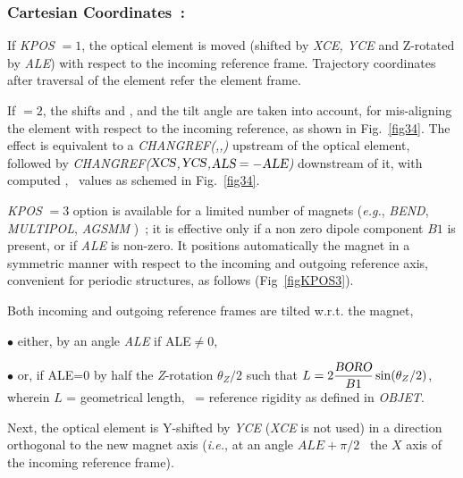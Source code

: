 { \subsubsection*{Cartesian Coordinates~: }    
 
 If \textsl{KPOS} $ =1$, the optical element is moved (shifted by \textsl{XCE, YCE} and Z-rotated by 
\textsl{ALE}) with respect to the incoming reference frame. Trajectory coordinates after traversal of the 
element refer the element frame. 

\medskip

\noindent If  \KPOS$=2 $, the shifts  \XCE{}   
and   \YCE{}, and the tilt angle \ALE{}   are taken into 
account, for mis-aligning  the element with respect to the incoming 
reference, as shown in Fig.~\ref{fig34}.  
The effect is equivalent to  a \textsl{CHANGREF(\XCE,\YCE,\ALE)}  upstream of the 
optical element, followed by   \textsl{CHANGREF($\textsl{XCS}$,$\textsl{YCS}$,$\textsl{ALS}=-\textsl{ALE}$)} downstream of it, with 
 computed \XCS, \YCS\ values as schemed in Fig.~\ref{fig34}.  

\medskip

\noindent \textsl{KPOS} $=3 $ option is available for a limited number of  
 magnets  (\emph{e.g.}, \textsl{BEND}, \textsl{MULTIPOL}, \textsl{AGSMM} )~; 
it is effective only if a non zero dipole component $B1$ is present, or if  \textsl{ALE} is non-zero. 
It positions automatically the magnet in a symmetric manner with respect to the incoming and outgoing reference 
axis, convenient for periodic structures, as follows (Fig~\ref{figKPOS3}). 

\medskip
 
\noindent Both incoming and outgoing reference frames are  tilted w.r.t. the magnet,  

 $\bullet$ either,  by an angle \textsl{ALE}  if ALE$\not =$0, 

 $\bullet$ or, if ALE=0  by  half the \textsl{Z}-rotation $\theta_Z/2$ such that $ L = 
2 \dfrac{\textsl{BORO}}{B1} \sin({\theta_Z}/{2})$,  wherein $L$ = geometrical length, 
\BORO\  = reference rigidity as defined in \textsl{OBJET}.

\noindent Next, the optical element is  Y-shifted by \textsl{YCE} (\textsl{XCE} is not used) in a 
direction orthogonal to the new magnet axis (\emph{i.e.}, at an angle $ALE+\pi/2$ \wrt\ the $X$ axis of the incoming 
reference frame).


}

